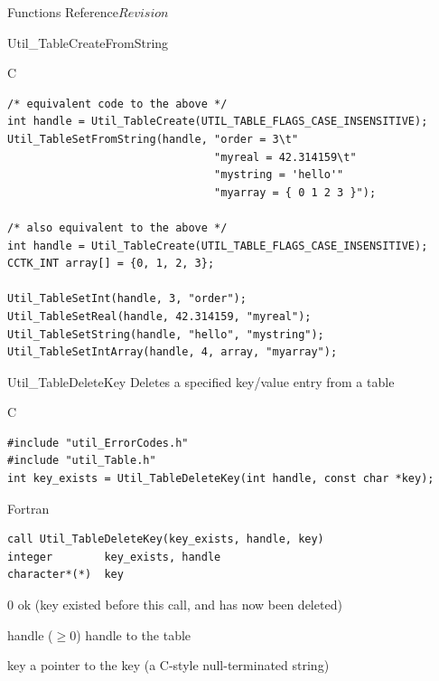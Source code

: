 \begin{cactuspart}{ Functions Reference}{}{$Revision$}
\begin{FunctionDescription}{Util\_TableCreateFromString}
\begin{ExampleSection}
\begin{Example}{C}
\begin{verbatim}
/* equivalent code to the above */
int handle = Util_TableCreate(UTIL_TABLE_FLAGS_CASE_INSENSITIVE);
Util_TableSetFromString(handle, "order = 3\t"
                                "myreal = 42.314159\t"
                                "mystring = 'hello'"
                                "myarray = { 0 1 2 3 }");

/* also equivalent to the above */
int handle = Util_TableCreate(UTIL_TABLE_FLAGS_CASE_INSENSITIVE);
CCTK_INT array[] = {0, 1, 2, 3};

Util_TableSetInt(handle, 3, "order");
Util_TableSetReal(handle, 42.314159, "myreal");
Util_TableSetString(handle, "hello", "mystring");
Util_TableSetIntArray(handle, 4, array, "myarray");
\end{verbatim}
\end{Example}
\end{ExampleSection}
\end{FunctionDescription}


\begin{FunctionDescription}{Util\_TableDeleteKey}
\label{Util-TableDeleteKey}
Deletes a specified key/value entry from a table

\begin{SynopsisSection}
\begin{Synopsis}{C}
\begin{verbatim}
#include "util_ErrorCodes.h"
#include "util_Table.h"
int key_exists = Util_TableDeleteKey(int handle, const char *key);
\end{verbatim}
\end{Synopsis}
\begin{Synopsis}{Fortran}
\begin{verbatim}
call Util_TableDeleteKey(key_exists, handle, key)
integer        key_exists, handle
character*(*)  key
\end{verbatim}
\end{Synopsis}
\end{SynopsisSection}

\begin{ResultSection}
\begin{Result}{\rm 0}
ok (key existed before this call, and has now been deleted)
\end{Result}
\end{ResultSection}

\begin{ParameterSection}
\begin{Parameter}{handle ($\ge 0$)}
handle to the table
\end{Parameter}
\begin{Parameter}{key}
a pointer to the key (a C-style null-terminated string)
\end{Parameter}
\end{ParameterSection}


\end{FunctionDescription}
\end{cactuspart}
